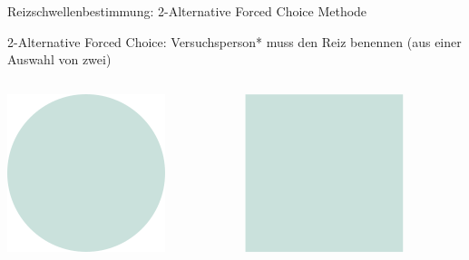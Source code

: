 \documentclass[aspectratio=169]{beamer}
\begin{document}
\begin{frame}{Reizschwellenbestimmung: 2-Alternative Forced Choice Methode}

 2-Alternative Forced Choice: Versuchsperson* muss den Reiz benennen (aus einer Auswahl von zwei) 

\begin{columns}[c]
\begin{column}{1cm}
\includegraphics[width=\textwidth]{reizschwelle_seriell_8.png}
\end{column}
\begin{column}{1cm}
\includegraphics[width=\textwidth]{reizschwelle_AFC_3.png}

\end{column}
\end{columns}
\end{frame}
\end{document}
